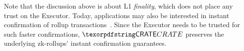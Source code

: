 Note that the discussion above is about L1 \emph{finality}, which does not place any trust on the Executor. Today, applications may also be interested in instant confirmation of rollup transactions~\cite{zksync-instant-confirmations}. Since the Executor needs to be trusted for such faster confirmations, $\pname$ preserves the underlying zk-rollups' instant confirmation guarantees.






